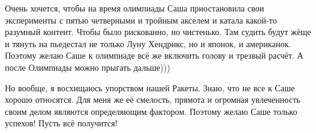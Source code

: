 Очень хочется, чтобы на время олимпиады Саша приостановила свои эксперименты с
пятью четверными и тройным акселем и катала какой-то разумный контент. Чтобы
было рискованно, но чистенько. Там судить будут жёще и тянуть на пьедестал не
только Луну Хендрикс, но и японок, и американок. Поэтому желаю Саше к олимпиаде
всё же включить голову и трезвый расчёт. А после Олимпиады можно прыгать
дальше)))

Но вообще, я восхищаюсь упорством нашей Ракеты. Знаю, что не все к Саше хорошо
относятся. Для меня же её смелость, прямота и огромная увлеченность своим делом
являются определяющим фактором. Поэтому желаю Саше только успехов! Пусть всё
получится! 
